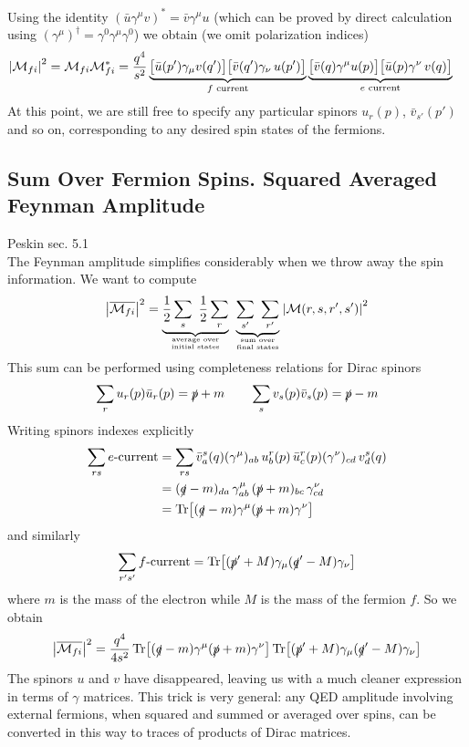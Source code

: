 \documentclass[TheoreticalPhy_ModB.tex]{subfiles}
\begin{document}
Using the identity $(\bar{u} \gamma^{\mu} v)^* = \bar{v} \gamma^{\mu} u$ (which can be proved by direct calculation using $(\gamma^{\mu})^{\dagger} = \gamma^0 \gamma^{\mu} \gamma^0$) we obtain (we omit polarization indices)
\[\begin{aligned}
\abs{\mathcal{M}_{fi}}^2 = \mathcal{M}_{fi} \mathcal{M}^*_{fi}
	& = \frac{q^4}{s^2} \underbrace{\bigl[ \bar{u}(p')\gamma_{\mu} v(q') \bigr]  \bigl[ \bar{v}(q') \gamma_{\nu} \, u(p') \bigr] }_{f\text{ current}}
	\underbrace{\bigl[ \bar{v}(q) \gamma^{\mu}u(p) \bigr]  \bigl[\bar{u}(p)\gamma^{\nu} \, v(q) \bigr]}_{e\text{ current}}
\end{aligned}\]
At this point, we are still free to specify any particular spinors $u_r(p)$, $\bar{v}_{s'}(p')$ and so on, corresponding to any desired spin states of the fermions.

\subsection{Sum Over Fermion Spins. Squared Averaged Feynman Amplitude}

\textsf{Peskin sec. 5.1}\\

The Feynman amplitude simplifies considerably when we throw away the spin information. We want to compute
\[
\abs{\overline{\mathM_{fi}}}^2 = \underbrace{\frac{1}{2} \sum_s \ \frac{1}{2} \sum_r}_{\textup{average over} \atop \text{initial states}} \ 
	\underbrace{\sum_{s'} \ \sum_{r'}}_{\textup{sum over} \atop \text{final states}} \abs{\mathM(r,s,r',s')}^2
\]
This sum can be performed using completeness relations for Dirac spinors
\[
\sum_r u_r(p) \bar{u}_r(p) = \slashed p + m
\qquad
\sum_s v_s(p) \bar{v}_s(p) = \slashed p - m
\]
Writing spinors indexes explicitly 
\[
\begin{split}
\sum_{rs} \text{$e$-current}	& = \sum_{rs} \bar{v}^s_a(q) (\gamma^{\mu})_{ab} \, u^r_b(p) \, \bar{u}^r_c(p) (\gamma^{\nu})_{cd} \, v_d^s(q) \\
					& = (\slashed q - m)_{da} \, \gamma^{\mu}_{ab} \, (\slashed p + m)_{bc} \, \gamma_{cd}^{\nu} \\
					& = \Tr \bigl[ (\slashed q - m) \gamma^{\mu} (\slashed p + m) \gamma^{\nu} \bigr]
\end{split}
\]
and similarly
\[
\sum_{r's'} \text{$f$-current} = \Tr \bigl[ (\slashed p' + M) \gamma_{\mu} (\slashed q' - M)\gamma_{\nu} \bigr]
\]
where $m$ is the mass of the electron while $M$ is the mass of the fermion $f$.
So we obtain
\[
\abs{\overline{\mathcal{M}_{fi}}}^2 = \frac{q^4}{4s^2} \Tr \bigl[ (\slashed q - m) \gamma^{\mu} (\slashed p + m) \gamma^{\nu} \bigr]
	\Tr \bigl[ (\slashed p' + M) \gamma_{\mu} (\slashed q' -M) \gamma_{\nu} \bigr]
\]
The spinors $u$ and $v$ have disappeared, leaving us with a much cleaner expression in terms of $\gamma$ matrices. This trick is very general: any QED amplitude involving external fermions, when squared and summed or averaged over spins, can be converted in this way to traces of products of Dirac matrices.
\end{document}
